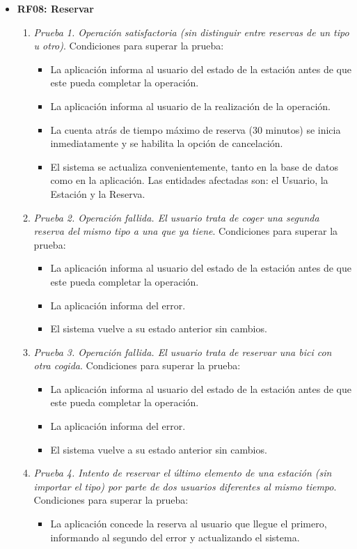 \begin{itemize}
	\item \textbf{RF08: Reservar}
	\begin{enumerate}
		\item \textit{Prueba 1. Operación satisfactoria (sin distinguir entre reservas de un tipo u otro)}. Condiciones para superar la prueba:
		\begin{itemize}
			\item La aplicación informa al usuario del estado de la estación antes de que este pueda completar la operación.
			\item La aplicación informa al usuario de la realización de la operación.
			\item La cuenta atrás de tiempo máximo de reserva (30 minutos) se inicia inmediatamente y se habilita la opción de cancelación.
			\item El sistema se actualiza convenientemente, tanto en la base de datos como en la aplicación. Las entidades afectadas son: el Usuario, la Estación y la Reserva.
		\end{itemize}
		\item \textit{Prueba 2. Operación fallida. El usuario trata de coger una segunda reserva del mismo tipo a una que ya tiene}. Condiciones para superar la prueba:
		\begin{itemize}
			\item La aplicación informa al usuario del estado de la estación antes de que este pueda completar la operación.
			\item La aplicación informa del error.
			\item El sistema vuelve a su estado anterior sin cambios.
		\end{itemize}
		\item \textit{Prueba 3. Operación fallida. El usuario trata de reservar una bici con otra cogida}. Condiciones para superar la prueba:
		\begin{itemize}
			\item La aplicación informa al usuario del estado de la estación antes de que este pueda completar la operación.
			\item La aplicación informa del error.
			\item El sistema vuelve a su estado anterior sin cambios.
		\end{itemize}
		\item \textit{Prueba 4. Intento de reservar el último elemento de una estación (sin importar el tipo) por parte de dos usuarios diferentes al mismo tiempo}. Condiciones para superar la prueba:
		\begin{itemize}
			\item La aplicación concede la reserva al usuario que llegue el primero, informando al segundo del error y actualizando el sistema.
		\end{itemize}
	\end{enumerate}
		

\end{itemize}
